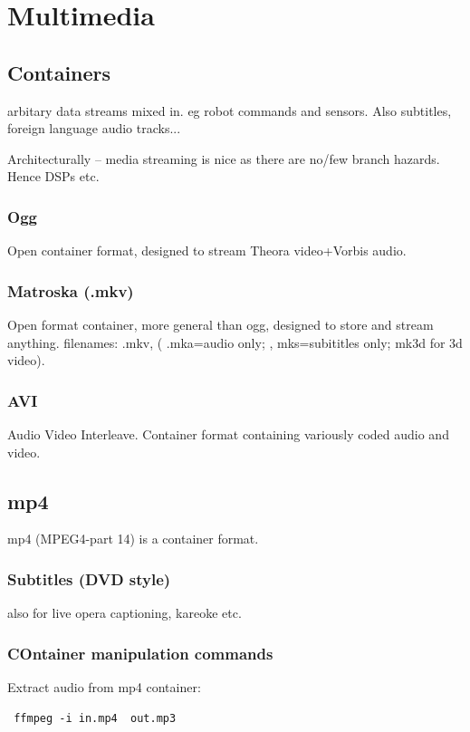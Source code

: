 \documentclass[oneside,english]{scrbook}
\begin{document}
\part{Multimedia}


\chapter{Containers}

arbitary data streams mixed in. eg robot commands and sensors. Also
subtitles, foreign language audio tracks...

Architecturally -- media streaming is nice as there are no/few branch hazards. Hence DSPs etc.

\section{Ogg}
Open container format, designed to stream Theora video+Vorbis audio.

\section{Matroska (.mkv)}
Open format container, more general than ogg, designed to store and stream anything.
filenames: .mkv,  ( .mka=audio only; , mks=subititles only; mk3d for 3d video).

\section{AVI}
Audio Video Interleave. Container format containing variously coded audio and video.

\chapter{mp4}
mp4 (MPEG4-part 14) is a container format.

\section{Subtitles (DVD style)}
also for live opera captioning, kareoke etc.

\section{COntainer manipulation commands}

Extract audio from mp4 container:
\begin{lstlisting}
 ffmpeg -i in.mp4  out.mp3
\end{lstlisting}
\end{document}
